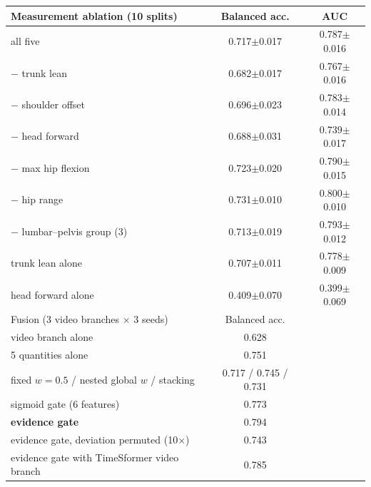 \begin{tabular}{lcc}
\toprule
Measurement ablation (10 splits) & Balanced acc. & AUC \\
\midrule
all five & 0.717$\pm$0.017 & 0.787$\pm$0.016 \\
$-$ trunk lean & 0.682$\pm$0.017 & 0.767$\pm$0.016 \\
$-$ shoulder offset & 0.696$\pm$0.023 & 0.783$\pm$0.014 \\
$-$ head forward & 0.688$\pm$0.031 & 0.739$\pm$0.017 \\
$-$ max hip flexion & 0.723$\pm$0.020 & 0.790$\pm$0.015 \\
$-$ hip range & 0.731$\pm$0.010 & 0.800$\pm$0.010 \\
$-$ lumbar--pelvis group (3) & 0.713$\pm$0.019 & 0.793$\pm$0.012 \\
trunk lean alone & 0.707$\pm$0.011 & 0.778$\pm$0.009 \\
head forward alone & 0.409$\pm$0.070 & 0.399$\pm$0.069 \\
\midrule
Fusion (3 video branches $\times$ 3 seeds) & Balanced acc. & \\
\midrule
video branch alone & 0.628 & \\
5 quantities alone & 0.751 & \\
fixed $w{=}0.5$ / nested global $w$ / stacking & 0.717 / 0.745 / 0.731 & \\
sigmoid gate (6 features) & 0.773 & \\
\textbf{evidence gate} & 0.794 & \\
evidence gate, deviation permuted (10$\times$) & 0.743 & \\
evidence gate with TimeSformer video branch & 0.785 & \\
\bottomrule
\end{tabular}
